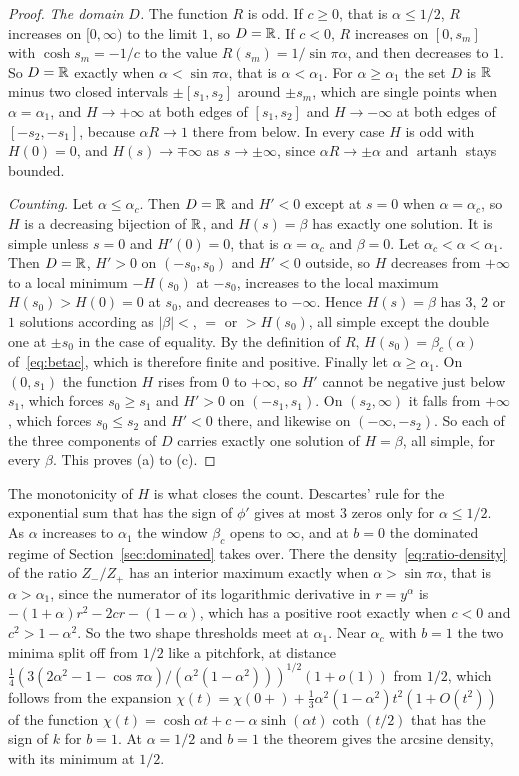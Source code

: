 \begin{proof}
\emph{The domain $D$.} The function $R$ is odd. If $c\ge0$, that is $\alpha\le1/2$, $R$ increases
on $[0,\infty)$ to the limit $1$, so $D=\mathbb{R}$. If $c<0$, $R$ increases on $[0,s_m]$ with
$\cosh s_m=-1/c$ to the value $R(s_m)=1/\sin\pi\alpha$, and then decreases to $1$. So $D=\mathbb{R}$ exactly
when $\alpha<\sin\pi\alpha$, that is $\alpha<\alpha_1$. For $\alpha\ge\alpha_1$ the set $D$ is $\mathbb{R}$
minus two closed intervals $\pm[s_1,s_2]$ around $\pm s_m$, which are single points when
$\alpha=\alpha_1$, and $H\to+\infty$ at both edges of $[s_1,s_2]$ and $H\to-\infty$ at both edges of
$[-s_2,-s_1]$, because $\alpha R\to1$ there from below. In every case $H$ is odd with $H(0)=0$,
and $H(s)\to\mp\infty$ as $s\to\pm\infty$, since $\alpha R\to\pm\alpha$ and $\operatorname{artanh}$ stays
bounded.

\emph{Counting.} Let $\alpha\le\alpha_c$. Then $D=\mathbb{R}$ and $H'<0$ except at $s=0$ when $\alpha=\alpha_c$,
so $H$ is a decreasing bijection of $\mathbb{R}$, and $H(s)=\beta$ has exactly one solution. It is
simple unless $s=0$ and $H'(0)=0$, that is $\alpha=\alpha_c$ and $\beta=0$. Let
$\alpha_c<\alpha<\alpha_1$. Then $D=\mathbb{R}$, $H'>0$ on $(-s_0,s_0)$ and $H'<0$ outside, so $H$ decreases
from $+\infty$ to a local minimum $-H(s_0)$ at $-s_0$, increases to the local maximum
$H(s_0)>H(0)=0$ at $s_0$, and decreases to $-\infty$. Hence $H(s)=\beta$ has $3$, $2$ or $1$
solutions according as $|\beta|<$, $=$ or $>H(s_0)$, all simple except the double one at
$\pm s_0$ in the case of equality. By the definition of $R$, $H(s_0)=\beta_c(\alpha)$
of~\eqref{eq:betac}, which is therefore finite and positive. Finally let $\alpha\ge\alpha_1$. On
$(0,s_1)$ the function $H$ rises from $0$ to $+\infty$, so $H'$ cannot be negative just below
$s_1$, which forces $s_0\ge s_1$ and $H'>0$ on $(-s_1,s_1)$. On $(s_2,\infty)$ it falls from
$+\infty$, which forces $s_0\le s_2$ and $H'<0$ there, and likewise on $(-\infty,-s_2)$. So each
of the three components of $D$ carries exactly one solution of $H=\beta$, all simple, for
every $\beta$. This proves (a) to (c).
\end{proof}

The monotonicity of $H$ is what closes the count. Descartes' rule for the exponential sum
that has the sign of $\phi'$ gives at most $3$ zeros only for $\alpha\le1/2$. As $\alpha$
increases to $\alpha_1$ the window $\beta_c$ opens to $\infty$, and at $b=0$ the dominated
regime of Section~\ref{sec:dominated} takes over. There the density~\eqref{eq:ratio-density}
of the ratio $Z_\minus/Z_\plus$ has an interior maximum exactly when $\alpha>\sin\pi\alpha$,
that is $\alpha>\alpha_1$, since the numerator of its logarithmic derivative in $r=y^\alpha$ is
$-(1+\alpha)r^2-2cr-(1-\alpha)$, which has a positive root exactly when $c<0$ and
$c^2>1-\alpha^2$. So the two shape thresholds meet at $\alpha_1$. Near $\alpha_c$ with $b=1$ the
two minima split off from $1/2$ like a pitchfork, at distance
$\frac14(3(2\alpha^2-1-\cos\pi\alpha)/(\alpha^2(1-\alpha^2)))^{1/2}(1+o(1))$ from $1/2$, which
follows from the expansion $\chi(t)=\chi(0+)+\frac13\alpha^2(1-\alpha^2)t^2(1+O(t^2))$ of the
function $\chi(t)=\cosh\alpha t+c-\alpha\sinh(\alpha t)\coth(t/2)$ that has the sign of $k$ for
$b=1$. At $\alpha=1/2$ and $b=1$ the theorem gives the arcsine density, with its minimum at
$1/2$.

